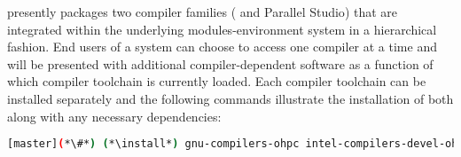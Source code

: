 \OHPC{} presently packages two compiler families ({\GNU{}} and {\Intel{}
  Parallel Studio}) that are integrated within the underlying
modules-environment system in a hierarchical fashion. End users of a \OHPC{}
system can choose to access one compiler at a time and will be presented with
additional compiler-dependent software as a function of which compiler
toolchain is currently loaded. Each compiler toolchain can be installed
separately and the following commands illustrate the installation of both along
with any necessary dependencies:

\begin{lstlisting}[language=bash]
[master](*\#*) (*\install*) gnu-compilers-ohpc intel-compilers-devel-ohpc
\end{lstlisting}
